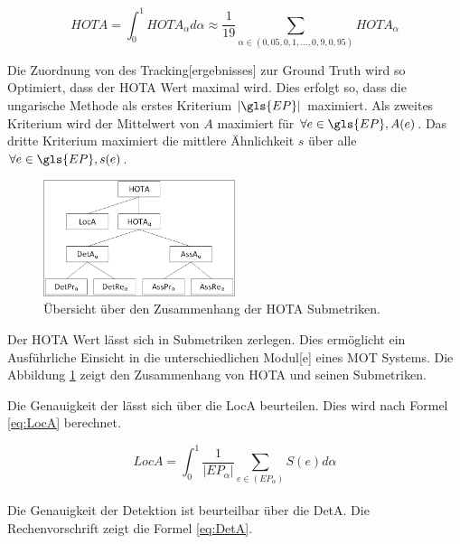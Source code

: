 \begin{equation}
    \label{eq:HOTA}
    HOTA = \int_{0}^{1} HOTA_{\alpha} d\alpha \approx \frac{1}{19} \sum_{\alpha \in (0,05, 0,1, \dots, 0,9, 0,95)} HOTA_{\alpha}
\end{equation}

Die Zuordnung von des \gls{Tracking}[ergebnisses] zur \gls{Ground Truth} wird so Optimiert, dass der \gls{HOTA} Wert maximal wird. Dies erfolgt so, dass die ungarische Methode als erstes Kriterium  \(|\gls{EP}|\) maximiert. Als zweites Kriterium wird der Mittelwert von \(A\) maximiert für \(\forall e \in \gls{EP}, A(e)\). Das dritte Kriterium maximiert die mittlere Ähnlichkeit \(s\) über alle \(\forall e \in \gls{EP}, s(e)\). \par
 
 \begin{figure}
    \begin{center}
        \vspace*{-5mm}
        \includegraphics[width=0.5\textwidth]{img/Grafiken/HOTA Submetriken Pyramide.png}
        \vspace*{-10mm}
        \caption{Übersicht über den Zusammenhang der HOTA Submetriken. \cite{HOTA}}
        \label{fig:HOTASubmetrikPyram}
    \end{center}
\end{figure}

 Der \gls{HOTA} Wert lässt sich in Submetriken zerlegen. Dies ermöglicht ein Ausführliche Einsicht in die unterschiedlichen \gls{Modul}[e] eines \gls{MOT} Systems. Die Abbildung \ref{fig:HOTASubmetrikPyram} zeigt den Zusammenhang von \gls{HOTA} und seinen Submetriken. \par 

Die Genauigkeit der  lässt sich über die \gls{LocA} beurteilen. Dies wird nach Formel \ref{eq:LocA} berechnet.

\begin{equation}
    \label{eq:LocA}
    LocA = \int_{0}^{1} \frac{1}{|EP_{\alpha}|} \sum_{e \in (EP_{\alpha})} S(e) d\alpha
\end{equation}
\\
Die Genauigkeit der \gls{Detektion} ist beurteilbar über die \gls{DetA}. Die Rechenvorschrift zeigt die Formel \ref{eq:DetA}.

